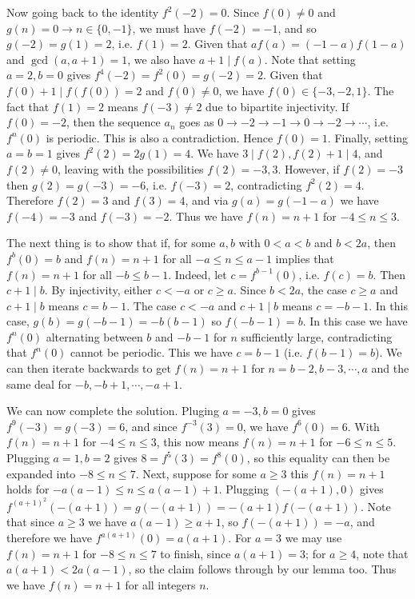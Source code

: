 \documentclass[11pt,a4paper]{article}
\begin{document}
\begin{enumerate}
	Now going back to the identity $f^2(-2)=0$. 
	Since $f(0)\neq 0$ and $g(n)=0\to n\in \{0, -1\}$, we must have 
	$f(-2)=-1$, and so $g(-2) = g(1) = 2$, i.e. $f(1)=2$. 
	Given that $af(a) = (-1-a)f(1-a)$ and $\gcd(a, a + 1)=1$, we also have $a + 1\mid f(a)$. 
	Note that setting $a=2, b=0$ gives $f^4(-2)=f^2(0)=g(-2)=2$. 
	Given that $f(0) + 1\mid f(f(0)) = 2$ and $f(0)\neq 0$, 
	we have $f(0)\in \{-3, -2, 1\}$. The fact that $f(1)=2$ means $f(-3)\neq 2$ due to bipartite injectivity. 
	If $f(0)=-2$, then the sequence $a_n$ goes as $0\to -2 \to -1 \to 0\to -2\to\cdots$, 
	i.e. $f^n(0)$ is periodic. 
	This is also a contradiction. Hence $f(0)=1$. 
	Finally, setting $a=b=1$ gives $f^2(2)=2g(1)=4$. 
	We have $3\mid f(2), f(2) + 1\mid 4$, and $f(2)\neq 0$, 
	leaving with the possibilities $f(2)=-3, 3$. 
	However, if $f(2)=-3$ then $g(2)=g(-3)=-6$, i.e. $f(-3)=2$, 
	contradicting $f^2(2)=4$. 
	Therefore $f(2)=3$ and $f(3)=4$, 
	and via $g(a)=g(-1-a)$ we have $f(-4)=-3$ and $f(-3)=-2$. 
	Thus we have $f(n)=n + 1$ for $-4\le n\le 3$. 
	
	The next thing is to show that if, for some $a, b$ with $0 < a < b$ and $b< 2a$, 
	then $f^b(0)=b$ and $f(n)=n+1$ for all $-a\le n\le a - 1$ implies that $f(n)=n+1$ for all $-b\le b - 1$. 
	Indeed, let $c=f^{b-1}(0)$, i.e. $f(c)=b$. 
	Then $c + 1\mid b$. 
	By injectivity, either $c < -a$ or $c \ge a$. 
	Since $b< 2a$, the case $c\ge a$ and $c + 1\mid b$ means $c = b - 1$. 
	The case $c < -a$ and $c + 1\mid b$ means $c = -b-1$. 
	In this case, $g(b) = g(-b-1)=-b(b-1)$ so $f(-b-1)=b$. 
	In this case we have $f^n(0)$ alternating between $b$ and $-b-1$ for $n$ sufficiently large, 
	contradicting that $f^n(0)$ cannot be periodic. 
	This we have $c=b-1$ (i.e. $f(b-1)=b$). 
	We can then iterate backwards to get $f(n)=n+1$ for $n=b-2, b-3, \cdots, a$ 
	and the same deal for $-b, -b+1, \cdots, -a+1$. 
	
	We can now complete the solution. Pluging $a=-3, b=0$ gives $f^9(-3)=g(-3)=6$, 
	and since $f^{-3}(3)=0$, we have $f^6(0)=6$. 
	With $f(n)=n + 1$ for $-4\le n\le 3$, 
	this now means $f(n)=n+1$ for $-6\le n\le 5$. 
	Plugging $a=1, b=2$ gives $8=f^5(3) = f^8(0)$, so this equality can then be expanded into 
	$-8\le n\le 7$. 
	Next,  suppose for some $a\ge 3$ this  $f(n)=n+1$ holds for $-a(a-1)\le n\le a(a-1)+1$. 
	Plugging $(-(a+1), 0)$ gives $f^{(a + 1)^2}(-(a + 1))=g(-(a + 1))=-(a+1)f(-(a+1))$. 
	Note that since $a\ge 3$ we have $a(a-1)\ge a + 1$, 
	so $f(-(a+1))=-a$, 
	and therefore we have $f^{a(a + 1)}(0) = a(a + 1)$. 
	For $a = 3$ we may use $f(n)=n+1$ for $-8\le n\le 7$ to finish, since $a(a + 1) = 3$; 
	for $a\ge 4$, 
	note that $a(a+1) < 2a(a - 1)$, so the claim follows through by our lemma too. 
	Thus we have $f(n)=n+1$ for all integers $n$. 
		

\end{enumerate}
\end{document}
